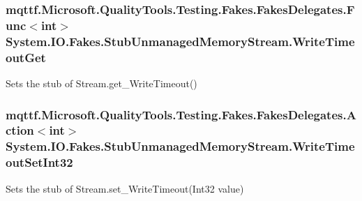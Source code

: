 \hypertarget{class_system_1_1_i_o_1_1_fakes_1_1_stub_unmanaged_memory_stream_a1eedd46a886a001b59e51d21a1635862}{
\subsubsection[{Write\-Timeout\-Get}]{\setlength{\rightskip}{0pt plus 5cm}mqttf.\-Microsoft.\-Quality\-Tools.\-Testing.\-Fakes.\-Fakes\-Delegates.\-Func$<$int$>$ System.\-I\-O.\-Fakes.\-Stub\-Unmanaged\-Memory\-Stream.\-Write\-Timeout\-Get}}\label{class_system_1_1_i_o_1_1_fakes_1_1_stub_unmanaged_memory_stream_a1eedd46a886a001b59e51d21a1635862}


Sets the stub of Stream.\-get\-\_\-\-Write\-Timeout()

\hypertarget{class_system_1_1_i_o_1_1_fakes_1_1_stub_unmanaged_memory_stream_a3bf910c40c5c43495cb4833f6d72ed08}{
\subsubsection[{Write\-Timeout\-Set\-Int32}]{\setlength{\rightskip}{0pt plus 5cm}mqttf.\-Microsoft.\-Quality\-Tools.\-Testing.\-Fakes.\-Fakes\-Delegates.\-Action$<$int$>$ System.\-I\-O.\-Fakes.\-Stub\-Unmanaged\-Memory\-Stream.\-Write\-Timeout\-Set\-Int32}}\label{class_system_1_1_i_o_1_1_fakes_1_1_stub_unmanaged_memory_stream_a3bf910c40c5c43495cb4833f6d72ed08}


Sets the stub of Stream.\-set\-\_\-\-Write\-Timeout(\-Int32 value)



